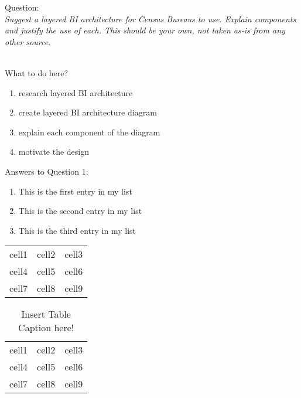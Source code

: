 Question:\\
\emph{Suggest a layered BI architecture for Census Bureaus to use. Explain components and
justify the use of each. This should be your own, not taken as-is from any other source.}

\\

What to do here?
\begin{enumerate}
    \item research layered BI architecture
    \item create layered BI architecture diagram
    \item explain each component of the diagram
    \item motivate the design
  \end{enumerate}

Answers to Question 1:

\begin{enumerate}
  \item This is the first entry in my list
  \item This is the second entry in my list
  \item This is the third entry in my list
\end{enumerate}

\begin{center}
    \begin{tabular}{ c c c }
        cell1 & cell2 & cell3 \\ 
        cell4 & cell5 & cell6 \\  
        cell7 & cell8 & cell9    
    \end{tabular}
\end{center}

\begin{table}[h]
\centering
    \begin{tabular}{ |c| c| c| }
     \hline
        cell1 & cell2 & cell3 \\ 
        cell4 & cell5 & cell6 \\  
        cell7 & cell8 & cell9 \\  
     \hline
    \end{tabular}\\
    \caption{Insert Table Caption here!}
    \label{table:1}
\end{table}